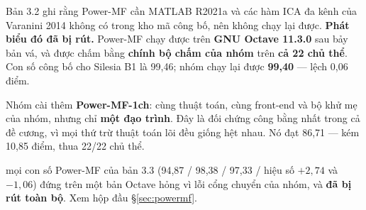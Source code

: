 \begin{ghichu}[title={Power-MF: bản 3.2 nói không chạy lại được --- bản 3.4 đã chạy, ở hai cấu hình}]
Bản 3.2 ghi rằng Power-MF cần MATLAB R2021a và các hàm ICA đa kênh của Varanini 2014 không có trong kho
mã công bố, nên không chạy lại được. \textbf{Phát biểu đó đã bị rút.} Power-MF chạy được trên
\textbf{GNU Octave 11.3.0} sau bảy bản vá, và được chấm bằng \textbf{chính bộ chấm của nhóm} trên
\textbf{cả 22 chủ thể}. Con số công bố cho Silesia B1 là 99,46; nhóm chạy lại được \textbf{99,40} ---
lệch 0,06 điểm.

Nhóm cài thêm \textbf{Power-MF-1ch}: cùng thuật toán, cùng front-end và bộ khử mẹ của nhóm, nhưng chỉ
\textbf{một đạo trình}. Đây là đối chứng công bằng nhất trong cả đề cương, vì mọi thứ trừ thuật toán lõi
đều giống hệt nhau. Nó đạt 86,71 --- kém \hethong{} 10,85 điểm, thua 22/22 chủ thể.

 mọi con số Power-MF của bản 3.3 (94,87 / 98,38 / 97,33 / hiệu số $+2{,}74$ và $-1{,}06$)
đứng trên một bản Octave hỏng vì lỗi cổng chuyển của nhóm, và \textbf{đã bị rút toàn bộ}. Xem hộp đầu
\S\ref{sec:powermf}.
\end{ghichu}
